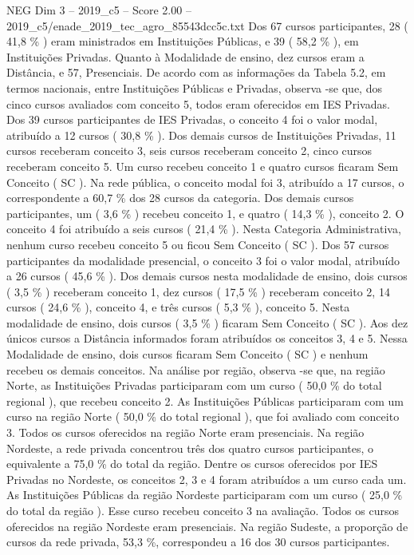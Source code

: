 \begin{textsample}{NEG Dim 3 – 2019\_c5 – Score 2.00 – 2019\_c5/enade\_2019\_tec\_agro\_85543dcc5c.txt}
Dos 67 cursos participantes, 28 ( 41,8 \% ) eram ministrados em Instituições Públicas, e 39 ( 58,2 \% ), em Instituições Privadas.
Quanto à Modalidade de ensino, dez cursos eram a Distância, e 57, Presenciais.
De acordo com as informações da Tabela 5.2, em termos nacionais, entre Instituições Públicas e Privadas, observa -se que, dos cinco cursos avaliados com conceito 5, todos eram oferecidos em IES Privadas.
Dos 39 cursos participantes de IES Privadas, o conceito 4 foi o valor modal, atribuído a 12 cursos ( 30,8 \% ).
Dos demais cursos de Instituições Privadas, 11 cursos receberam conceito 3, seis cursos receberam conceito 2, cinco cursos receberam conceito 5.
Um curso recebeu conceito 1 e quatro cursos ficaram Sem Conceito ( SC ).
Na rede pública, o conceito modal foi 3, atribuído a 17 cursos, o correspondente a 60,7 \% dos 28 cursos da categoria.
Dos demais cursos participantes, um ( 3,6 \% ) recebeu conceito 1, e quatro ( 14,3 \% ), conceito 2.
O conceito 4 foi atribuído a seis cursos ( 21,4 \% ).
Nesta Categoria Administrativa, nenhum curso recebeu conceito 5 ou ficou Sem Conceito ( SC ).
Dos 57 cursos participantes da modalidade presencial, o conceito 3 foi o valor modal, atribuído a 26 cursos ( 45,6 \% ).
Dos demais cursos nesta modalidade de ensino, dois cursos ( 3,5 \% ) receberam conceito 1, dez cursos ( 17,5 \% ) receberam conceito 2, 14 cursos ( 24,6 \% ), conceito 4, e três cursos ( 5,3 \% ), conceito 5.
Nesta modalidade de ensino, dois cursos ( 3,5 \% ) ficaram Sem Conceito ( SC ).
Aos dez únicos cursos a Distância informados foram atribuídos os conceitos 3, 4 e 5.
Nessa Modalidade de ensino, dois cursos ficaram Sem Conceito ( SC ) e nenhum recebeu os demais conceitos.
Na análise por região, observa -se que, na região Norte, as Instituições Privadas participaram com um curso ( 50,0 \% do total regional ), que recebeu conceito 2.
As Instituições Públicas participaram com um curso na região Norte ( 50,0 \% do total regional ), que foi avaliado com conceito 3.
Todos os cursos oferecidos na região Norte eram presenciais.
Na região Nordeste, a rede privada concentrou três dos quatro cursos participantes, o equivalente a 75,0 \% do total da região.
Dentre os cursos oferecidos por IES Privadas no Nordeste, os conceitos 2, 3 e 4 foram atribuídos a um curso cada um.
As Instituições Públicas da região Nordeste participaram com um curso ( 25,0 \% do total da região ).
Esse curso recebeu conceito 3 na avaliação.
Todos os cursos oferecidos na região Nordeste eram presenciais.
Na região Sudeste, a proporção de cursos da rede privada, 53,3 \%, correspondeu a 16 dos 30 cursos participantes.

\end{textsample}
